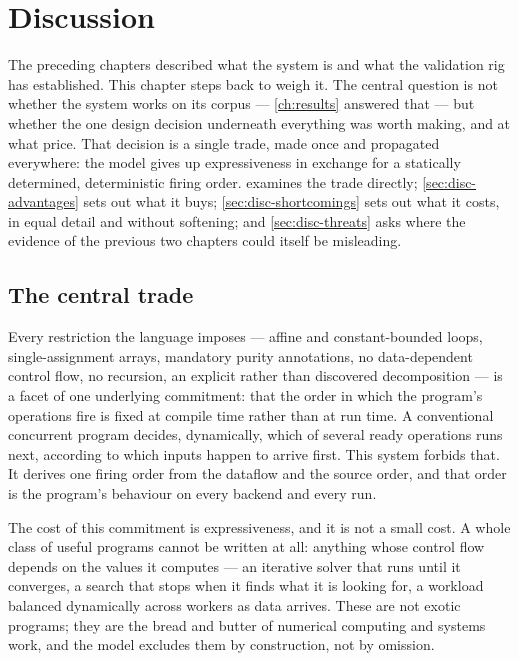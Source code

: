 \chapter{Discussion}\label{ch:discussion}

The preceding chapters described what the system is and what the validation rig
has established. This chapter steps back to weigh it. The central question is not
whether the system works on its corpus --- \cref{ch:results} answered that --- but
whether the one design decision underneath everything was worth making, and at what
price. That decision is a single trade, made once and propagated everywhere: the
model gives up expressiveness in exchange for a statically determined,
deterministic firing order.  examines the trade directly;
\cref{sec:disc-advantages} sets out what it buys; \cref{sec:disc-shortcomings}
sets out what it costs, in equal detail and without softening; and
\cref{sec:disc-threats} asks where the evidence of the previous two chapters could
itself be misleading.

\section{The central trade}\label{sec:disc-trade}

Every restriction the language imposes --- affine and constant-bounded loops,
single-assignment arrays, mandatory purity annotations, no data-dependent control
flow, no recursion, an explicit rather than discovered decomposition --- is a
facet of one underlying commitment: that the order in which the program's
operations fire is fixed at compile time rather than at run time. A conventional
concurrent program decides, dynamically, which of several ready operations runs
next, according to which inputs happen to arrive first. This system forbids that.
It derives one firing order from the dataflow and the source order, and that order
is the program's behaviour on every backend and every run.

The cost of this commitment is expressiveness, and it is not a small cost. A whole
class of useful programs cannot be written at all: anything whose control flow
depends on the values it computes --- an iterative solver that runs until it
converges, a search that stops when it finds what it is looking for, a workload
balanced dynamically across workers as data arrives. These are not exotic
programs; they are the bread and butter of numerical computing and systems work,
and the model excludes them by construction, not by omission.

